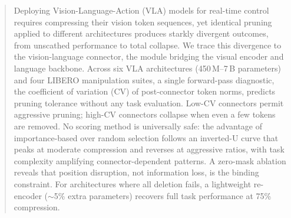 \begin{abstract}
Deploying Vision-Language-Action (VLA) models for real-time control requires compressing their vision token sequences, yet identical pruning applied to different architectures produces starkly divergent outcomes, from unscathed performance to total collapse. We trace this divergence to the vision-language connector, the module bridging the visual encoder and language backbone. Across six VLA architectures (450\,M--7\,B parameters) and four LIBERO manipulation suites, a single forward-pass diagnostic, the coefficient of variation (CV) of post-connector token norms, predicts pruning tolerance without any task evaluation. Low-CV connectors permit aggressive pruning; high-CV connectors collapse when even a few tokens are removed. No scoring method is universally safe: the advantage of importance-based over random selection follows an inverted-U curve that peaks at moderate compression and reverses at aggressive ratios, with task complexity amplifying connector-dependent patterns. A zero-mask ablation reveals that position disruption, not information loss, is the binding constraint. For architectures where all deletion fails, a lightweight re-encoder (${\sim}$5\% extra parameters) recovers full task performance at 75\% compression.
\end{abstract}
